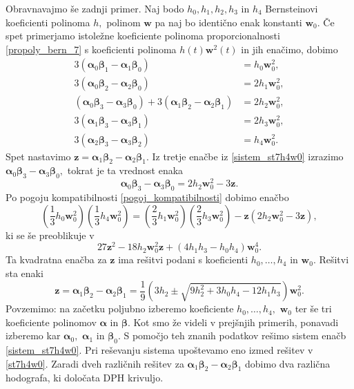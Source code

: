 \documentclass[12pt,a4paper,twoside]{article}
\theoremstyle{definition} %
\theoremstyle{plain} %
\theoremstyle{primerstyle}
\numberwithin{equation}{section}  %
\newcommand{\wV}{\mathbf{w}}
\newcommand{\zV}{\mathbf{z}}
\newcommand{\balpha}{\boldsymbol \alpha}
\newcommand{\bbeta}{\boldsymbol \beta}
\begin{document}
Obravnavajmo še zadnji primer. Naj bodo $h_0,h_1,h_2,h_3$ in $h_4$ Bernsteinovi koeficienti polinoma $h,$ polinom $\wV$ pa naj bo identično enak konstanti $\wV_0.$ Če spet primerjamo istoležne koeficiente polinoma proporcionalnosti \eqref{propoly_bern_7} s koeficienti polinoma $h(t)\wV^2(t)$ in jih enačimo, dobimo
\begin{align}
	3(\balpha_0\bbeta_1-\balpha_1\bbeta_0)&=h_0\wV_0^2,\nonumber\\
	3(\balpha_0\bbeta_2-\balpha_2\bbeta_0)&=2h_1\wV_0^2,\nonumber\\
	(\balpha_0\bbeta_3-\balpha_3\bbeta_0)+3(\balpha_1\bbeta_2-\balpha_2\bbeta_1)&=2h_2\wV_0^2,\label{sistem_st7h4w0}\\
	3(\balpha_1\bbeta_3-\balpha_3\bbeta_1)&=2h_3\wV_0^2,\nonumber\\
	3(\balpha_2\bbeta_3-\balpha_3\bbeta_2)&=h_4\wV_0^2.\nonumber
\end{align}
Spet nastavimo $\zV=\balpha_1\bbeta_2-\balpha_2\bbeta_1.$ Iz tretje enačbe iz \eqref{sistem_st7h4w0} izrazimo $\balpha_0\bbeta_3-\balpha_3\bbeta_0,$ tokrat je ta vrednost enaka $$\balpha_0\bbeta_3-\balpha_3\bbeta_0=2h_2\wV_0^2-3\zV.$$ Po pogoju kompatibilnosti \eqref{pogoj_kompatibilnosti} dobimo enačbo
\begin{equation*}
	\left(\frac{1}{3}h_0\wV_0^2\right)\left(\frac{1}{3}h_4\wV_0^2\right)=\left(\frac{2}{3}h_1\wV_0^2\right)\left(\frac{2}{3}h_3\wV_0^2\right)-\zV(2h_2\wV_0^2-3\zV),
\end{equation*}
ki se še preoblikuje v
\begin{equation*}
	27\zV^2-18h_2\wV_0^2\zV+(4h_1h_3-h_0h_4)\wV_0^4.
\end{equation*}
Ta kvadratna enačba za $\zV$ ima rešitvi podani s koeficienti $h_0,\dots,h_4$ in $\wV_0.$ Rešitvi sta enaki
\begin{equation}
	\label{st7h4w0}
	\zV=\balpha_1\bbeta_2-\balpha_2\bbeta_1=\frac{1}{9}\left(3h_2\pm\sqrt{9h_2^2+3h_0h_4-12h_1h_3}\right)\wV_0^2.
\end{equation}
Povzemimo: na začetku poljubno izberemo koeficiente $h_0,\dots,h_4,$ $\wV_0$ ter še tri koeficiente polinomov $\balpha$ in $\bbeta.$ Kot smo že videli v prejšnjih primerih, ponavadi izberemo kar $\balpha_0,$ $\balpha_1$ in $\bbeta_0.$ S pomočjo teh znanih podatkov rešimo sistem enačb \eqref{sistem_st7h4w0}. Pri reševanju sistema upoštevamo eno izmed rešitev v \eqref{st7h4w0}. Zaradi dveh različnih rešitev za $\balpha_1\bbeta_2-\balpha_2\bbeta_1$ dobimo dva različna hodografa, ki določata DPH krivuljo.
\clearpage
\end{document}
